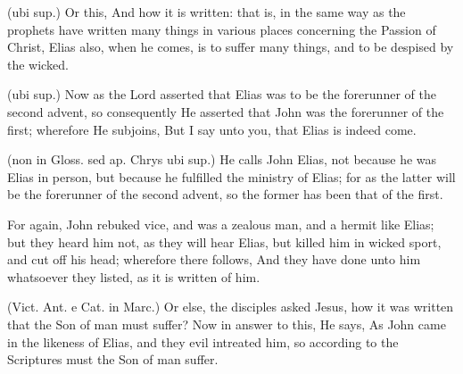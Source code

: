  (ubi sup.) Or this, And how it is written: that is, in the same way as the prophets have written many things in various places concerning the Passion of Christ, Elias also, when he comes, is to suffer many things, and to be despised by the wicked.

 (ubi sup.) Now as the Lord asserted that Elias was to be the forerunner of the second advent, so consequently He asserted that John was the forerunner of the first; wherefore He subjoins, But I say unto you, that Elias is indeed come.

 (non in Gloss. sed ap. Chrys ubi sup.) He calls John Elias, not because he was Elias in person, but because he fulfilled the ministry of Elias; for as the latter will be the forerunner of the second advent, so the former has been that of the first.

 For again, John rebuked vice, and was a zealous man, and a hermit like Elias; but they heard him not, as they will hear Elias, but killed him in wicked sport, and cut off his head; wherefore there follows, And they have done unto him whatsoever they listed, as it is written of him.

 (Vict. Ant. e Cat. in Marc.) Or else, the disciples asked Jesus, how it was written that the Son of man must suffer? Now in answer to this, He says, As John came in the likeness of Elias, and they evil intreated him, so according to the Scriptures must the Son of man suffer.

